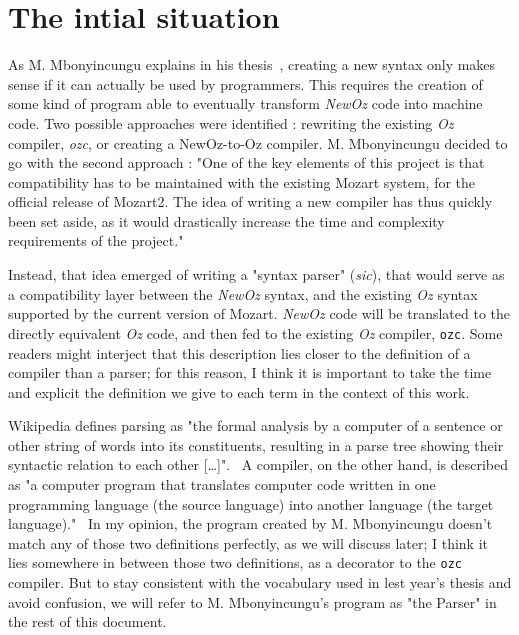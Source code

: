 \section{The intial situation}\label{sec:ch3-Parser}
As M. Mbonyincungu explains in his thesis~\cite{jpthesis}, creating a new syntax only makes sense if it can actually be used by programmers.
This requires the creation of some kind of program able to eventually transform \textit{NewOz} code into machine code.
Two possible approaches were identified : rewriting the existing \textit{Oz} compiler, \textit{ozc}, or creating a NewOz-to-Oz compiler.
M. Mbonyincungu decided to go with the second approach :
"One of the key elements of this project is that compatibility has to be maintained with the existing Mozart system, for the official release of Mozart2.
The idea of writing a new compiler has thus quickly been set aside, as it would drastically increase the time and complexity requirements of the project."~\cite{jpthesis}

Instead, that idea emerged of writing a "syntax parser" (\textit{sic}), that would serve as a compatibility layer between the \textit{NewOz} syntax, and the existing \textit{Oz} syntax supported by the current version of Mozart.
\textit{NewOz} code will be translated to the directly equivalent \textit{Oz} code, and then fed to the existing \textit{Oz} compiler, \texttt{ozc}.
Some readers might interject that this description lies closer to the definition of a compiler than a parser;
for this reason, I think it is important to take the time and explicit the definition we give to each term in the context of this work.\newline

Wikipedia defines parsing as "the formal analysis by a computer of a sentence or other string of words into its constituents, resulting in a parse tree showing their syntactic relation to each other [\ldots]".~\cite{wikiParser}
A compiler, on the other hand, is described as "a computer program that translates computer code written in one programming language (the source language) into another language (the target language)."~\cite{wikiCompiler}
In my opinion, the program created by M. Mbonyincungu doesn't match any of those two definitions perfectly, as we will discuss later;
I think it lies somewhere in between those two definitions, as a decorator to the \texttt{ozc} compiler.
But to stay consistent with the vocabulary used in lest year's thesis and avoid confusion, we will refer to M. Mbonyincungu's program as "the Parser" in the rest of this document.\newline


